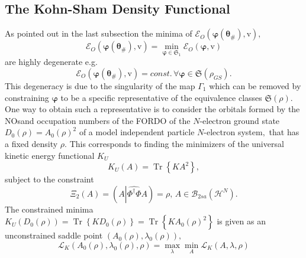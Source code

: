 \documentclass[aps,preprint]{revtex4}%
\begin{document}
\subsection{The Kohn-Sham Density Functional\label{KSDF}}

As pointed out in the last subsection the minima of $\mathcal{E}_{O}\left(
\boldsymbol{\varphi}\left(  \boldsymbol{\theta}_{\#}\right)  ,\mathrm{v}%
\right)  ,$
\begin{equation}
\mathcal{E}_{O}\left(  \boldsymbol{\varphi}\left(  \boldsymbol{\theta}%
_{\#}\right)  \boldsymbol{,}\mathrm{v}\right)  =\min_{\boldsymbol{\varphi\in
}\mathfrak{S}_{1}}\mathcal{E}_{O}\left(  \boldsymbol{\varphi,}\mathrm{v}%
\right)
\end{equation}
are highly degenerate e.g.
\begin{equation}
\mathcal{E}_{O}\left(  \boldsymbol{\varphi}\left(  \boldsymbol{\theta}%
_{\#}\right)  \boldsymbol{,}\mathrm{v}\right)  =const.\,\forall
\boldsymbol{\varphi\in}\mathfrak{S}\left(  \rho_{GS}\right)  .
\end{equation}
This degeneracy is due to the singularity of the map $\Gamma_{1}$ which can be
removed by constraining $\boldsymbol{\varphi}$ to be a specific representative
of the equivalence classes $\mathfrak{S}\left(  \rho\right)  .$ One way to
obtain such a representative is to consider the orbitals formed by the NOsand
occupation numbers of the FORDO of the $N$-electron ground state $D_{0}\left(
\rho\right)  =A_{0}\left(  \rho\right)  ^{2}$ of a model independent particle
$N$-electron system$,$ that has a fixed density $\rho.$ This corresponds to
finding the minimizers of the universal kinetic energy functional $K_{U}$
\begin{equation}
K_{U}\left(  A\right)  =\operatorname{Tr}\left\{  KA^{2}\right\}  ,
\end{equation}
subject to the constraint
\begin{equation}
\Xi_{2}\left(  A\right)  =\left(  A\left\vert \widehat{\Phi^{\dagger}\Phi
}A\right.  \right)  =\rho,\,A\in\mathcal{B}_{2sa}\left(  \mathcal{H}%
^{N}\right)  .
\end{equation}
The constrained minima $K_{U}\left(  D_{0}\left(  \rho\right)  \right)
=\operatorname{Tr}\left\{  KD_{0}\left(  \rho\right)  \right\}
=\operatorname{Tr}\left\{  KA_{0}\left(  \rho\right)  ^{2}\right\}  $ is given
as an unconstrained saddle point $\left(  A_{0}\left(  \rho\right)
,\lambda_{0}\left(  \rho\right)  \right)  ,$
\begin{equation}
\mathcal{L}_{K}\left(  A_{0}\left(  \rho\right)  ,\lambda_{0}\left(
\rho\right)  ,\rho\right)  =\max_{\lambda}\min_{A}\mathcal{L}_{K}\left(
A,\lambda,\rho\right)
\end{equation}
\end{document}
